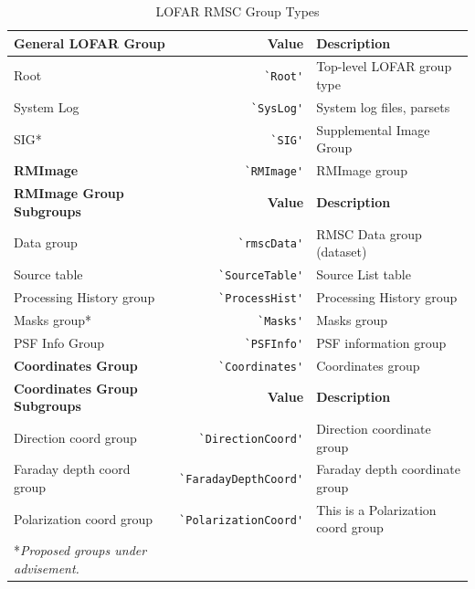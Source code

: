 \documentclass[a4paper,10pt,bibtotoc]{scrartcl}
\begin{document}
\begin{table}[ht]
  \centering
  \begin{tabular}{|lrp{6cm}|} 
    \hline
    \sc \textbf{General LOFAR Group} & \sc \textbf{Value} & \textbf{Description} \\
    \hline
    Root          & \verb|`Root'|    & Top-level LOFAR group type \\
    System Log    & \verb|`SysLog'|  & System log files, parsets \\
    SIG*  				& \verb|`SIG'| & Supplemental Image Group \\
    \textbf{RMImage} & \verb|`RMImage'|   & RMImage group \\
    \hline \hline
    \sc \textbf{RMImage Group Subgroups} & \textbf{Value} & \textbf{Description} \\
    \hline
    Data group  & \verb|`rmscData'| & RMSC Data group (dataset) \\
    Source table & \verb|`SourceTable'| & Source List table  \\
    Processing History group &\verb|`ProcessHist'| & Processing History group \\
    Masks group* & \verb|`Masks'| &  Masks group \\
    PSF Info Group &\verb|`PSFInfo'| & PSF information group \\
    \textbf{Coordinates Group} & \verb|`Coordinates'| & Coordinates group \\
    \hline
    \sc \textbf{Coordinates Group Subgroups} & \textbf{Value} & \textbf{Description} \\
    \hline
    Direction coord group &\verb|`DirectionCoord'|& Direction coordinate group \\
    Faraday depth coord group   &\verb|`FaradayDepthCoord'|  & Faraday depth coordinate group \\
    Polarization coord group    &\verb|`PolarizationCoord'|    & This is a Polarization coord group \\
    \hline
    *\textit{Proposed groups under advisement.} & & \\ 
    \hline
  \end{tabular}
  \caption{LOFAR RMSC Group Types}
  \label{tab:group types}
\end{table}
\end{document}
